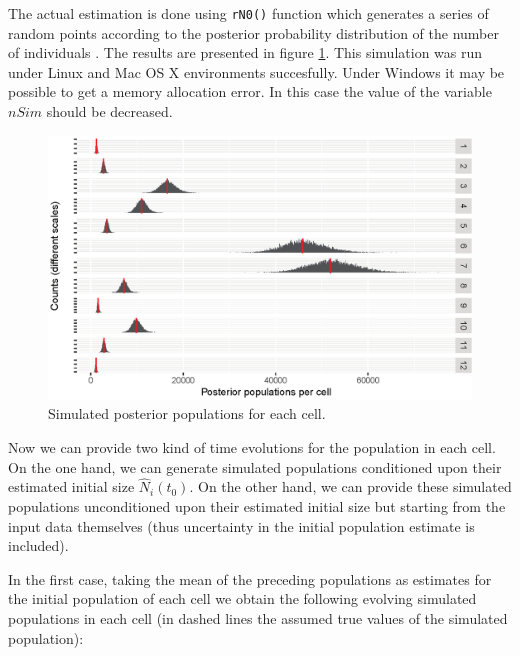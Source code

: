 \documentclass[12pt, a4paper]{article}
\begin{document}
The actual estimation is done using \texttt{rN0()} function which generates a series of random points according to the posterior probability distribution of the number of individuals . The results are presented in 
figure \ref{time1}. This simulation
was run under Linux and Mac OS X environments succesfully. Under Windows it may be 
possible to get a memory allocation error.
In this case the value of the variable $nSim$ should be decreased. 

\begin{figure}
\centering
\includegraphics[scale=0.85]{time1.eps}
\caption{Simulated posterior populations for each cell.}
\label{time1} 	
\end{figure}


Now we can provide two kind of time evolutions for the population in each cell. On the one hand, 
we can generate simulated populations conditioned upon their estimated initial size $\widehat{N}_{i}(t_{0})$. 
On the other hand, we can provide these simulated populations unconditioned upon their estimated 
initial size but starting from the input data themselves (thus uncertainty in the initial population estimate is included).

In the first case, taking the mean of the preceding populations as estimates for the initial population 
of each cell we obtain the following evolving simulated populations in each cell (in dashed lines the 
assumed true values of the simulated population):
\end{document}
